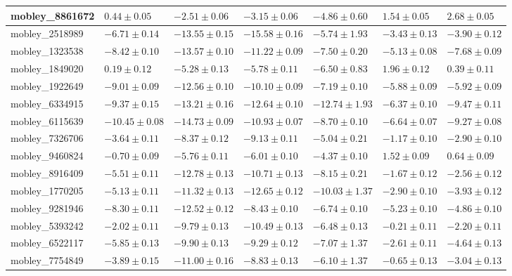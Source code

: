 \documentclass{article}
\begin{document}
\begin{landscape}
\begin{longtable}{|l{3.0cm}|l{3.0cm}|l{3.2cm}|l{3.6cm}|l{3.0cm}|l{3.0cm}|l{3.0cm}|}
mobley\_8861672	&	$	0.44	\pm	0.05	$	&	$	-2.51	\pm	0.06	$	&	$	-3.15	\pm	0.06	$	&	$	-4.86	\pm	0.60	$	&	$	1.54	\pm	0.05	$	&	$	2.68	\pm	0.05	$	\\ \hline
mobley\_2518989	&	$	-6.71	\pm	0.14	$	&	$	-13.55	\pm	0.15	$	&	$	-15.58	\pm	0.16	$	&	$	-5.74	\pm	1.93	$	&	$	-3.43	\pm	0.13	$	&	$	-3.90	\pm	0.12	$	\\ \hline
mobley\_1323538	&	$	-8.42	\pm	0.10	$	&	$	-13.57	\pm	0.10	$	&	$	-11.22	\pm	0.09	$	&	$	-7.50	\pm	0.20	$	&	$	-5.13	\pm	0.08	$	&	$	-7.68	\pm	0.09	$	\\ \hline
mobley\_1849020	&	$	0.19	\pm	0.12	$	&	$	-5.28	\pm	0.13	$	&	$	-5.78	\pm	0.11	$	&	$	-6.50	\pm	0.83	$	&	$	1.96	\pm	0.12	$	&	$	0.39	\pm	0.11	$	\\ \hline
mobley\_1922649	&	$	-9.01	\pm	0.09	$	&	$	-12.56	\pm	0.10	$	&	$	-10.10	\pm	0.09	$	&	$	-7.19	\pm	0.10	$	&	$	-5.88	\pm	0.09	$	&	$	-5.92	\pm	0.09	$	\\ \hline
mobley\_6334915	&	$	-9.37	\pm	0.15	$	&	$	-13.21	\pm	0.16	$	&	$	-12.64	\pm	0.10	$	&	$	-12.74	\pm	1.93	$	&	$	-6.37	\pm	0.10	$	&	$	-9.47	\pm	0.11	$	\\ \hline
mobley\_6115639	&	$	-10.45	\pm	0.08	$	&	$	-14.73	\pm	0.09	$	&	$	-10.93	\pm	0.07	$	&	$	-8.70	\pm	0.10	$	&	$	-6.64	\pm	0.07	$	&	$	-9.27	\pm	0.08	$	\\ \hline
mobley\_7326706	&	$	-3.64	\pm	0.11	$	&	$	-8.37	\pm	0.12	$	&	$	-9.13	\pm	0.11	$	&	$	-5.04	\pm	0.21	$	&	$	-1.17	\pm	0.10	$	&	$	-2.90	\pm	0.10	$	\\ \hline
mobley\_9460824	&	$	-0.70	\pm	0.09	$	&	$	-5.76	\pm	0.11	$	&	$	-6.01	\pm	0.10	$	&	$	-4.37	\pm	0.10	$	&	$	1.52	\pm	0.09	$	&	$	0.64	\pm	0.09	$	\\ \hline
mobley\_8916409	&	$	-5.51	\pm	0.11	$	&	$	-12.78	\pm	0.13	$	&	$	-10.71	\pm	0.13	$	&	$	-8.15	\pm	0.21	$	&	$	-1.67	\pm	0.12	$	&	$	-2.56	\pm	0.12	$	\\ \hline
mobley\_1770205	&	$	-5.13	\pm	0.11	$	&	$	-11.32	\pm	0.13	$	&	$	-12.65	\pm	0.12	$	&	$	-10.03	\pm	1.37	$	&	$	-2.90	\pm	0.10	$	&	$	-3.93	\pm	0.12	$	\\ \hline
mobley\_9281946	&	$	-8.30	\pm	0.11	$	&	$	-12.52	\pm	0.12	$	&	$	-8.43	\pm	0.10	$	&	$	-6.74	\pm	0.10	$	&	$	-5.23	\pm	0.10	$	&	$	-4.86	\pm	0.10	$	\\ \hline
mobley\_5393242	&	$	-2.02	\pm	0.11	$	&	$	-9.79	\pm	0.13	$	&	$	-10.49	\pm	0.13	$	&	$	-6.48	\pm	0.13	$	&	$	-0.21	\pm	0.11	$	&	$	-2.20	\pm	0.11	$	\\ \hline
mobley\_6522117	&	$	-5.85	\pm	0.13	$	&	$	-9.90	\pm	0.13	$	&	$	-9.29	\pm	0.12	$	&	$	-7.07	\pm	1.37	$	&	$	-2.61	\pm	0.11	$	&	$	-4.64	\pm	0.13	$	\\ \hline
mobley\_7754849	&	$	-3.89	\pm	0.15	$	&	$	-11.00	\pm	0.16	$	&	$	-8.83	\pm	0.13	$	&	$	-6.10	\pm	1.37	$	&	$	-0.65	\pm	0.13	$	&	$	-3.04	\pm	0.13	$	\\ \hline

\end{longtable}
\end{landscape}
\end{document}
